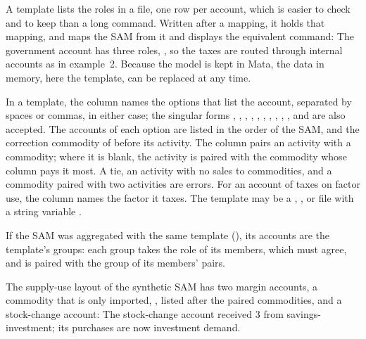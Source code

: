 
A template lists the roles in a file, one row per account, which is easier to
check and to keep than a long command. Written after a mapping, it holds that
mapping, and  maps the SAM from it and displays the
equivalent command:
The government account has three roles, , so the
taxes are routed through internal accounts as in example~2. Because the model
is kept in Mata, the data in memory, here the template, can be replaced at
any time.

In a template, the  column names the options that list the account,
separated by spaces or commas, in either case; the singular forms
, , , ,
, , , ,
, ,  and  are
also accepted. The accounts of each option are listed in the order of the SAM,
and the correction commodity of  before its activity. The
 column pairs an activity with a commodity; where it is blank, the
activity is paired with the commodity whose column pays it most. A tie, an
activity with no sales to commodities, and a commodity paired with two
activities are errors. For an account of taxes on factor use, the 
column names the factor it taxes. The template may be a ,
,  or  file with a string variable
.

If the SAM was aggregated with the same template (), its
accounts are the template's groups: each group takes the role of its members,
which must agree, and is paired with the group of its members' pairs.


The supply-use layout of the synthetic SAM has two margin accounts, a
commodity that is only imported, , listed after the paired
commodities, and a stock-change account:
The stock-change account received 3 from savings-investment; its purchases are
now investment demand.


